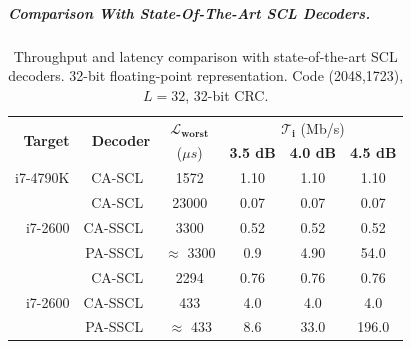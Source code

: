 \subparagraph{Comparison With State-Of-The-Art SCL Decoders.}

\begin{table}
  \centering
  \caption{Throughput and latency comparison with state-of-the-art SCL decoders.
    32-bit floating-point representation. Code (2048,1723), $L = 32$, 32-bit
    CRC.}
  \label{tab:polar_scl_perfs_comparison}
  \begin{tabular}{r|r|c|c c c}
    \multirow{2}{*}{\textbf{Target}} & \multirow{2}{*}{\textbf{Decoder}} & \multirow{1}{*}{\textbf{$\bm{\mathcal{L}_{worst}}$}} & \multicolumn{3}{c}{$\bm{\mathcal{T}_i}$ (Mb/s)} \\
    \cline{4-6}
    &                                & ($\mu s$)                         & \textbf{3.5 dB} & \textbf{4.0 dB} & \textbf{4.5 dB} \\
    \hline
    \multirow{1}{*}{i7-4790K}
    & CA-SCL~\cite{Shen2016}         &  1572                             &  1.10           &  1.10           &   1.10          \\
    \hline
    \multirow{3}{*}{i7-2600}
    & CA-SCL~\cite{Sarkis2014b}      & 23000                             &  0.07           &  0.07           &   0.07          \\
    & CA-SSCL~\cite{Sarkis2014b}     &  3300                             &  0.52           &  0.52           &   0.52          \\
    & PA-SSCL~\cite{Sarkis2014b}     & $\approx$ 3300                    &  0.9            &  4.90           &  54.0           \\
    \hline
    \multirow{3}{*}{i7-2600}
    & CA-SCL~\cite{Sarkis2016}       &  2294                             &  0.76           &  0.76           &   0.76          \\
    & CA-SSCL~\cite{Sarkis2016}      &   433                             &  4.0            &  4.0            &   4.0           \\
    & PA-SSCL~\cite{Sarkis2016}      & $\approx$ 433                     &  8.6            & 33.0            & 196.0           \\
    \hline

\end{tabular}
\end{table}
